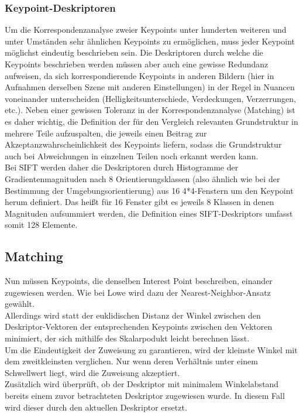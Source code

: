 \documentclass[deutsch]{scrartcl}
\begin{document}
\subsubsection{Keypoint-Deskriptoren}
Um die Korrespondenzanalyse zweier Keypoints unter hunderten weiteren und unter Umständen sehr ähnlichen Keypoints zu ermöglichen, muss jeder Keypoint möglichst eindeutig beschrieben sein. Die Deskriptoren durch welche die Keypoints beschrieben werden müssen aber auch eine gewisse Redundanz aufweisen, da sich korrespondierende Keypoints in anderen Bildern (hier in Aufnahmen derselben Szene mit anderen Einstellungen) in der Regel in Nuancen voneinander unterscheiden (Helligkeitsunterschiede, Verdeckungen, Verzerrungen, etc.). Neben einer gewissen Toleranz in der Korrespondenzanalyse (Matching) ist es daher wichtig, die Definition der für den Vergleich relevanten Grundstruktur in mehrere Teile aufzuspalten, die jeweils einen Beitrag zur Akzeptanzwahrscheinlichkeit des Keypoints liefern, sodass die Grundstruktur auch bei Abweichungen in einzelnen Teilen noch erkannt werden kann.\\
Bei SIFT werden daher die Deskriptoren durch Histogramme der Gradientenmagnituden nach 8 Orientierungsklassen (also ähnlich wie bei der Bestimmung der Umgebungsorientierung) aus 16 4*4-Fenstern um den Keypoint herum definiert. Das heißt für 16 Fenster gibt es jeweils 8 Klassen in denen Magnituden aufsummiert werden, die Definition eines SIFT-Deskriptors umfasst somit 128 Elemente.\cite{lowe04}

\subsection{Matching} 
Nun müssen Keypoints, die denselben Interest Point beschreiben, einander zugewiesen werden. Wie bei Lowe\cite{lowe04} wird dazu der Nearest-Neighbor-Ansatz gewählt.\\
Allerdings wird statt der euklidischen Distanz der Winkel zwischen den Deskriptor-Vektoren der entsprechenden Keypoints zwischen den Vektoren minimiert, der sich mithilfe des Skalarpodukt leicht berechnen lässt. \\
Um die Eindeutigkeit der Zuweisung zu garantieren, wird der kleinste Winkel mit dem zweitkleinsten verglichen\cite{lowe04}. Nur wenn deren Verhältnis unter einem Schwellwert liegt, wird die Zuweisung akzeptiert.\\
Zusätzlich wird überprüft, ob der Deskriptor mit minimalem Winkelabstand bereits einem zuvor betrachteten Deskriptor zugewiesen wurde. In diesem Fall wird dieser durch den aktuellen Deskriptor ersetzt.\\
\end{document}
